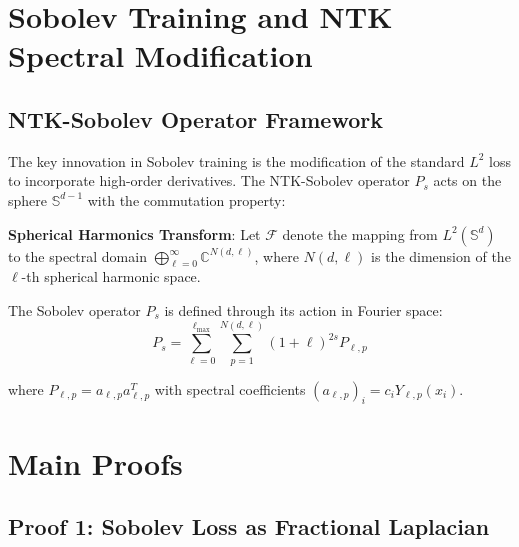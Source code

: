 \documentclass{article}
\begin{document}
\section{Sobolev Training and NTK Spectral Modification}

\subsection{NTK-Sobolev Operator Framework}

The key innovation in Sobolev training is the modification of the standard $L^2$ loss to incorporate high-order derivatives. The NTK-Sobolev operator $P_s$ acts on the sphere $\mathbb{S}^{d-1}$ with the commutation property:

\textbf{Spherical Harmonics Transform}: Let $\mathcal{F}$ denote the mapping from $L^2(\mathbb{S}^d)$ to the spectral domain $\bigoplus_{\ell=0}^{\infty} \mathbb{C}^{N(d,\ell)}$, where $N(d,\ell)$ is the dimension of the $\ell$-th spherical harmonic space.

The Sobolev operator $P_s$ is defined through its action in Fourier space:
\[ P_s = \sum_{\ell=0}^{\ell_{\max}} \sum_{p=1}^{N(d,\ell)} (1+\ell)^{2s}P_{\ell,p} \]

where $P_{\ell,p} = a_{\ell,p}a_{\ell,p}^T$ with spectral coefficients $(a_{\ell,p})_i = c_iY_{\ell,p}(x_i)$.
\section{Main Proofs}

\subsection{Proof 1: Sobolev Loss as Fractional Laplacian}
\end{document}
